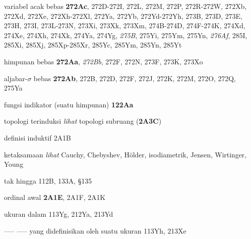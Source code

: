 variabel acak bebas {\bf 272Ac},
272D-272I, 
272L, 272M, 272P, 272R-272W, 
272Xb, 272Xd, 272Xe, 272Xh-272Xl, 
272Ya, 272Yb, 272Yd-272Yh, 
273B, 273D, 273E, 273H, 273I,
273L-273N, 
273Xi, 273Xk, 273Xm, 274B-274D, 
274F-274K, 
274Xd, 274Xe, 274Xh, 274Xk, 274Ya, 274Yg,
{\it 275B}, 275Yi, 275Ym, 275Yn, {\it 276Af}, 285I, 285Xi, 285Xj,
285Xp-285Xr, 
285Yc, 285Ym, 285Yn, 285Yt



himpunan bebas {\bf 272Aa}, {\it 272Bb}, 272F, 272N, 273F,
273K, 273Xo




aljabar-$\sigma$ bebas {\bf 272Ab}, 272B, 272D, 272F, 272J,
272K, 272M, 272O, 272Q, 275Ya





fungsi indikator (suatu himpunan) {\bf 122Aa}









topologi terinduksi {\it lihat} topologi subruang ({\bf 2A3C})


definisi induktif 2A1B








ketaksamaan {\it lihat} Cauchy, Chebyshev, H\"older, isodiametrik, Jensen, Wirtinger, Young














tak hingga 112B, 133A, \S135





ordinal awal {\bf 2A1E}, 2A1F, 2A1K












ukuran dalam 113Yg,
  212Ya, 213Yd
  

----- ----- yang didefinisikan oleh suatu ukuran 113Yh,
  213Xe 


